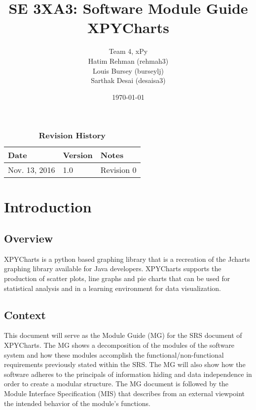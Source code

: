 \documentclass[12pt, titlepage]{article}
\title{SE 3XA3: Software Module Guide\\XPYCharts}
\author{Team 4, xPy
		\\ Hatim Rehman (rehmah3)
		\\ Louis Bursey (burseylj)
		\\ Sarthak Desai (desaisa3)
}
\date{\today}
\begin{document}
\maketitle

\tableofcontents
\listoftables
\listoffigures

\begin{table}[bp]
\caption{\bf Revision History}
\begin{tabularx}{\textwidth}{p{3cm}p{2cm}X}
\toprule {\bf Date} & {\bf Version} & {\bf Notes}\\
\midrule
Nov. 13, 2016 & 1.0 & Revision 0\\

\bottomrule
\end{tabularx}
\end{table}

\newpage


\section{Introduction}
\subsection{Overview}
XPYCharts is a python based graphing library that is a recreation of the Jcharts graphing library available for Java developers. XPYCharts supports the production of scatter plots, line graphs and pie charts that can be used for statistical analysis and in a learning environment for data visualization.
\subsection{Context}
This document will serve as the Module Guide (MG) for the SRS document of XPYCharts. The MG shows a decomposition of the modules of the software system and how these modules accomplish the functional/non-functional requirements previously stated within the SRS. The MG will also show how the software adheres to the principals of information hiding and data independence in order to create a modular structure. The MG document is followed by the Module Interface Specification (MIS) that describes from an external viewpoint the intended behavior of the module’s functions. 
\end{document}
